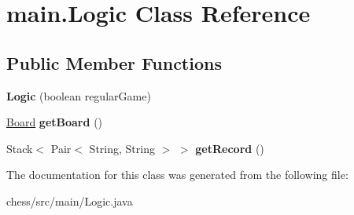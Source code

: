\hypertarget{classmain_1_1_logic}{}\section{main.\+Logic Class Reference}
\label{classmain_1_1_logic}
\subsection*{Public Member Functions}
\begin{DoxyCompactItemize}
\item 
\mbox{\label{classmain_1_1_logic_a64e3cd346ecaed735f24de73fc2195d0}} 
{\bfseries Logic} (boolean regular\+Game)
\item 
\mbox{\label{classmain_1_1_logic_a31784313ffc58af2b089141675f3aed5}} 
\mbox{\hyperlink{classmain_1_1_board}{Board}} {\bfseries get\+Board} ()
\item 
\mbox{\label{classmain_1_1_logic_ae8fd43d0c6a0bed9689bf3592a58749a}} 
Stack$<$ Pair$<$ String, String $>$ $>$ {\bfseries get\+Record} ()
\end{DoxyCompactItemize}


The documentation for this class was generated from the following file\+:\begin{DoxyCompactItemize}
\item 
chess/src/main/Logic.\+java\end{DoxyCompactItemize}

